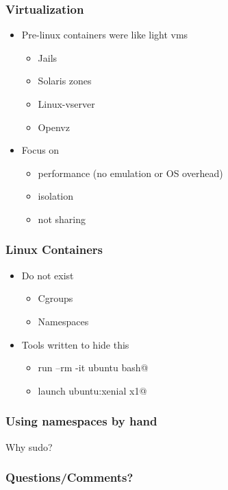 \documentclass{beamer}
\begin{document}
\begin{frame}[fragile]
\frametitle{Virtualization}
	\begin{itemize}
	\item Pre-linux containers were like light vms
		\begin{itemize}
		\item Jails
		\item Solaris zones
		\item Linux-vserver
		\item Openvz
		\end{itemize}
	\item Focus on 
		\begin{itemize}
		\item performance (no emulation or OS overhead)
		\item isolation
		\item not sharing
		\end{itemize}
	\end{itemize}
\end{frame}

\begin{frame}[fragile]
\frametitle{Linux Containers}
	\begin{itemize}
	\item Do not exist
		\begin{itemize}
		\item Cgroups
		\item Namespaces
		\end{itemize}
	\item Tools written to hide this
		\begin{itemize}
		\item \verb@docker run --rm -it ubuntu bash@
		\item \verb@lxc launch ubuntu:xenial x1@
		\end{itemize}
	\end{itemize}
\end{frame}

\begin{frame}
\frametitle{Using namespaces by hand}
\begin{center}
\begin{figure}

\end{figure}
\pause
\vspace{1in}
Why sudo?
\end{center}
\end{frame}


\begin{frame}
\frametitle{Questions/Comments?}
\end{frame}

\end{document}
